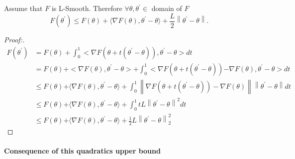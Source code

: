 \begin{lem}
    Assume that $ F $  is L-Smooth. Therefore $ \forall \theta , \theta ^\prime \in  $ domain of $ F $ 
    \[
        F(\theta ^\prime ) \leq  F(\theta ) + \langle \nabla F(\theta ) , \theta ^\prime  - \theta \rangle + \frac{L}{2} \left\| \theta ^\prime  - \theta  \right\| 
    .\]
\end{lem}
\begin{proof}[Proof:]
    \begin{align*}
        F (\theta ^\prime ) 
            &= F(\theta ) + \int_{0}^{1} < \nabla F(\theta  + t(\theta ^\prime - \theta )), \theta ^\prime - \theta > dt \\
            &= F(\theta ) \mathbf{+} < \nabla F(\theta ), \theta ^\prime  - \theta > + \int_{0}^{1} < \nabla F(\theta  + t(\theta ^\prime - \theta )) \mathbf{-} \nabla F(\theta ), \theta ^\prime  - \theta > dt \\
            &\leq F(\theta ) \mathbf{+} \langle \nabla F(\theta ), \theta ^\prime  - \theta \rangle + \int_{0}^{1} \left\| \nabla F(\theta + t(\theta ^\prime  - \theta )) - \nabla F(\theta ) \right\| \left\| \theta  ^\prime - \theta  \right\| dt \\
            &\leq F(\theta ) \mathbf{+} \langle \nabla F(\theta ), \theta ^\prime  - \theta \rangle + \int_{0}^{1} t L \left\| \theta ^\prime  - \theta  \right\|^2 dt \\
            &\leq F(\theta ) \mathbf{+} \langle \nabla F(\theta ), \theta ^\prime  - \theta \rangle + \frac{1}{2} L \left\| \theta  ^\prime  - \theta  \right\| ^2 _2
    \end{align*}
\end{proof}

\paragraph*{Consequence of this quadratics upper bound }

